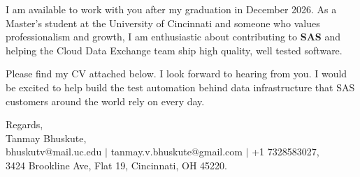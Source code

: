 \documentclass[11pt]{letter}
\begin{document}
\begin{letter}{}
I am available to work with you after my graduation in December 2026. As a Master's student at the University of Cincinnati and someone who values professionalism and growth, I am enthusiastic about contributing to \textbf{SAS} and helping the Cloud Data Exchange team ship high quality, well tested software.

Please find my CV attached below. I look forward to hearing from you. I would be excited to help build the test automation behind data infrastructure that SAS customers around the world rely on every day.

{\setlength{\parskip}{0pt}
Regards,\\
Tanmay Bhuskute,\\
bhuskutv@mail.uc.edu $\mid$ tanmay.v.bhuskute@gmail.com $\mid$ +1 7328583027,\\
3424 Brookline Ave, Flat 19, Cincinnati, OH 45220.
}

\end{letter}
\end{document}
